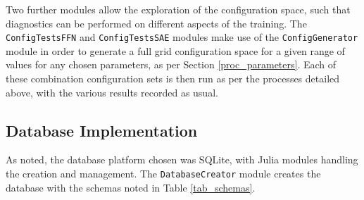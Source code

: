 \documentclass[a4paper,11pt,oneside]{article}
\theoremstyle{plain}
\theoremstyle{definition}
\begin{document}
	Two further modules allow the exploration of the configuration space, such that diagnostics can be performed on different aspects of the training. 	The \texttt{ConfigTestsFFN} \citep{DCConfigTestsFFN} and \texttt{ConfigTestsSAE} \citep{DCConfigTestsSAE} modules make use of the \texttt{ConfigGenerator} module \citep{DCGenerator} in order to generate a full grid configuration space for a given range of values for any chosen parameters, as per Section \ref{proc_parameters}. Each of these combination configuration sets is then run as per the processes detailed above, with the various results recorded as usual. 
	
	\subsection{Database Implementation}
	
	As noted, the database platform chosen was SQLite, with Julia modules handling the creation and management. The \texttt{DatabaseCreator} module \citep{DCDatabaseCreator} creates the database with the schemas noted in Table \ref{tab_schemas}.\newline
	
\end{document}
